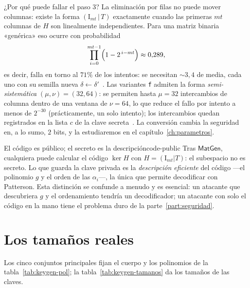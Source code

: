 \documentclass[11pt,a4paper,oneside]{report}
\begin{document}
¿Por qué puede fallar el paso 3? La eliminación por filas no puede
mover columnas: existe la forma $(\mathrm{I}_{mt}\,|\,T)$ exactamente
cuando las primeras $mt$ columnas de $\hat H$ son linealmente
independientes. Para una matriz binaria «genérica» eso ocurre con
probabilidad
\[
  \prod_{i=0}^{mt-1}\Bigl(1-2^{\,i-mt}\Bigr)\approx0{,}289,
\]
es decir, falla en torno al $71\%$ de los intentos: se necesitan
$\sim3{,}4$ de media, cada uno con su semilla nueva
$\delta\leftarrow\delta'$~\cite{cmrationale}. Las variantes \texttt{f}
admiten la forma \emph{semi-sistemática} $(\mu,\nu)=(32,64)$: se
permiten hasta $\mu=32$ intercambios de columna dentro de una ventana
de $\nu=64$, lo que reduce el fallo por intento a menos de $2^{-30}$
(prácticamente, un solo intento); los intercambios quedan registrados
en la lista $c$ de la clave secreta~\cite{cmrationale}. La conversión
cambia la seguridad en, a lo sumo, $2$ bits, y la estudiaremos en el
capítulo~\ref{ch:parametros}.

\begin{observacion}{El código es público; el secreto es la descripción}{code-public}
Tras $\textsf{MatGen}$, cualquiera puede calcular el código $\ker H$
con $H=(\mathrm{I}_{mt}|T)$: el subespacio no es secreto. Lo que guarda
la clave privada es la \emph{descripción eficiente} del código ---el
polinomio $g$ y el orden de las $\alpha_i$---, la única que permite
decodificar con Patterson. Esta distinción se confunde a menudo y es
esencial: un atacante que descubriera $g$ y el ordenamiento tendría un
decodificador; un atacante con solo el código en la mano tiene el
problema duro de la parte~\ref{part:seguridad}.
\end{observacion}

\section{Los tamaños reales}

Los cinco conjuntos principales fijan el cuerpo y los polinomios de la
tabla~\ref{tab:keygen-pol}; la tabla~\ref{tab:keygen-tamanos} da los
tamaños de las claves.
\end{document}
